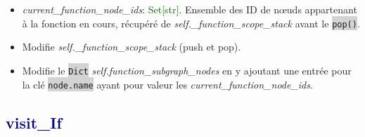 \documentclass[11pt,a4paper]{article}
\newcommand{\code}[1]{\colorbox{lightgray}{\texttt{\small #1}}}
\newcommand{\var}[1]{\textit{#1}}
\newcommand{\vartype}[1]{\textcolor{darkgreen}{#1}}
\newcommand{\methodname}[1]{\textbf{\textcolor{darkblue}{#1}}}
\begin{document}
\begin{description}
\begin{itemize}
        \item \var{current\_function\_node\_ids}: \vartype{Set[str]}. Ensemble des ID de nœuds appartenant à la fonction en cours, récupéré de \var{self.\_function\_scope\_stack} avant le \code{pop()}.
        \item Modifie \var{self.\_function\_scope\_stack} (push et pop).
        \item Modifie le \code{Dict} \var{self.function\_subgraph\_nodes} en y ajoutant une entrée pour la clé \code{node.name} ayant pour valeur les \var{current\_function\_node\_ids}.
    \end{itemize}
\end{description}

\subsection*{\methodname{visit\_If}}
\end{document}
